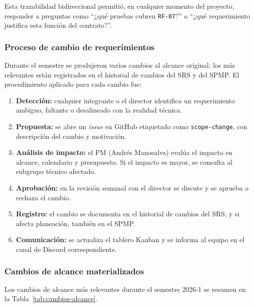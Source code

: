 \documentclass[12pt,oneside]{report}
\begin{document}
      Esta trazabilidad bidireccional permitió, en cualquier momento del proyecto, responder a preguntas como ``¿qué pruebas cubren \texttt{RF-07}?'' o ``¿qué requerimiento justifica esta función del contrato?''.

      \subsubsection{Proceso de cambio de requerimientos}
      Durante el semestre se produjeron varios cambios al alcance original; los más relevantes están registrados en el historial de cambios del SRS y del SPMP. El procedimiento aplicado para cada cambio fue:
      \begin{enumerate}
        \item \textbf{Detección:} cualquier integrante o el director identifica un requerimiento ambiguo, faltante o desalineado con la realidad técnica.
        \item \textbf{Propuesta:} se abre un \textit{issue} en GitHub etiquetado como \texttt{scope-change}, con descripción del cambio y motivación.
        \item \textbf{Análisis de impacto:} el PM (Andrés Manosalva) evalúa el impacto en alcance, calendario y presupuesto. Si el impacto es mayor, se consulta al subgrupo técnico afectado.
        \item \textbf{Aprobación:} en la revisión semanal con el director se discute y se aprueba o rechaza el cambio.
        \item \textbf{Registro:} el cambio se documenta en el historial de cambios del SRS, y si afecta planeación, también en el SPMP.
        \item \textbf{Comunicación:} se actualiza el tablero Kanban y se informa al equipo en el canal de Discord correspondiente.
      \end{enumerate}

      \subsubsection{Cambios de alcance materializados}
      Los cambios de alcance más relevantes durante el semestre 2026-1 se resumen en la Tabla~\ref{tab:cambios-alcance}.
\end{document}
